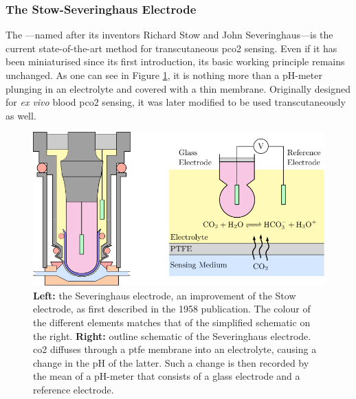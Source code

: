 \subsubsection{The Stow-Severinghaus Electrode}\label{subsect:choos:review:ssel}

The \ssel---named after its inventors Richard Stow\cite{severinghaus1986_3} and John Severinghaus\cite{severinghaus1958}---is the current state-of-the-art method for transcutaneous \gls{pco2} sensing\cite{conway2018}. Even if it has been miniaturised since its first introduction, its basic working principle remains unchanged. As one can see in Figure \ref{fig:choos:review:ssel_outline}, it is nothing more than a pH-meter plunging in an electrolyte and covered with a thin membrane. Originally designed for \emph{ex vivo} blood \gls{pco2} sensing, it was later modified to be used transcutaneously as well\cite{beran1976}.

\begin{figure}
	\centering
	\includegraphics{1_main_matter/choos_figures/review/ssel_converted}
	\caption[The Stow-Severinghaus electrode.]{\textbf{Left:} the Severinghaus electrode, an improvement of the Stow electrode, as first described in the 1958 publication\cite{severinghaus1958}. The colour of the different elements matches that of the simplified schematic on the right. \textbf{Right:} outline schematic of the Severinghaus electrode. \gls{co2} diffuses through a \gls{ptfe} membrane into an electrolyte, causing a change in the pH of the latter. Such a change is then recorded by the mean of a pH-meter that consists of a glass electrode and a reference electrode.}
	\label{fig:choos:review:ssel_outline}
\end{figure}

